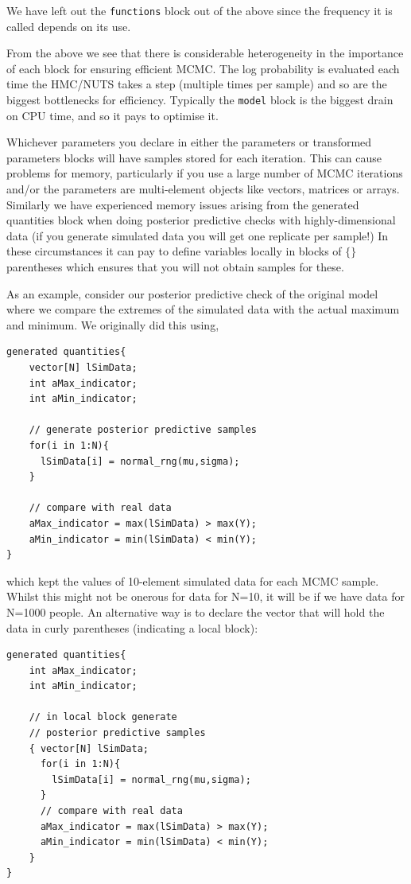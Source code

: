 \documentclass[11pt,fullpage]{book}
\begin{document}
We have left out the \texttt{functions} block out of the above since the frequency it is called depends on its use. 

From the above we see that there is considerable heterogeneity in the importance of each block for ensuring efficient MCMC. The log probability is evaluated each time the HMC/NUTS takes a step (multiple times per sample) and so are the biggest bottlenecks for efficiency. Typically the \texttt{model} block is the biggest drain on CPU time, and so it pays to optimise it.

Whichever parameters you declare in either the parameters or transformed parameters blocks will have samples stored for each iteration. This can cause problems for memory, particularly if you use a large number of MCMC iterations and/or the parameters are multi-element objects like vectors, matrices or arrays. Similarly we have experienced memory issues arising from the generated quantities block when doing posterior predictive checks with highly-dimensional data (if you generate simulated data you will get one replicate per sample!) In these circumstances it can pay to define variables locally in blocks of $\{\}$ parentheses which ensures that you will not obtain samples for these. 

As an example, consider our posterior predictive check of the original model where we compare the extremes of the simulated data with the actual maximum and minimum. We originally did this using,

\begin{verbatim}
generated quantities{
    vector[N] lSimData;
    int aMax_indicator;
    int aMin_indicator;
      
    // generate posterior predictive samples
    for(i in 1:N){
      lSimData[i] = normal_rng(mu,sigma);
    }
     
    // compare with real data 
    aMax_indicator = max(lSimData) > max(Y);
    aMin_indicator = min(lSimData) < min(Y);
}
\end{verbatim}

which kept the values of 10-element simulated data for each MCMC sample. Whilst this might not be onerous for data for N=10, it will be if we have data for N=1000 people. An alternative way is to declare the vector that will hold the data in curly parentheses (indicating a local block):

\begin{verbatim}
generated quantities{
    int aMax_indicator;
    int aMin_indicator;
      
    // in local block generate 
    // posterior predictive samples
    { vector[N] lSimData;
      for(i in 1:N){
        lSimData[i] = normal_rng(mu,sigma);
      }
      // compare with real data 
      aMax_indicator = max(lSimData) > max(Y);
      aMin_indicator = min(lSimData) < min(Y);
    }
}
\end{verbatim}
\end{document}
